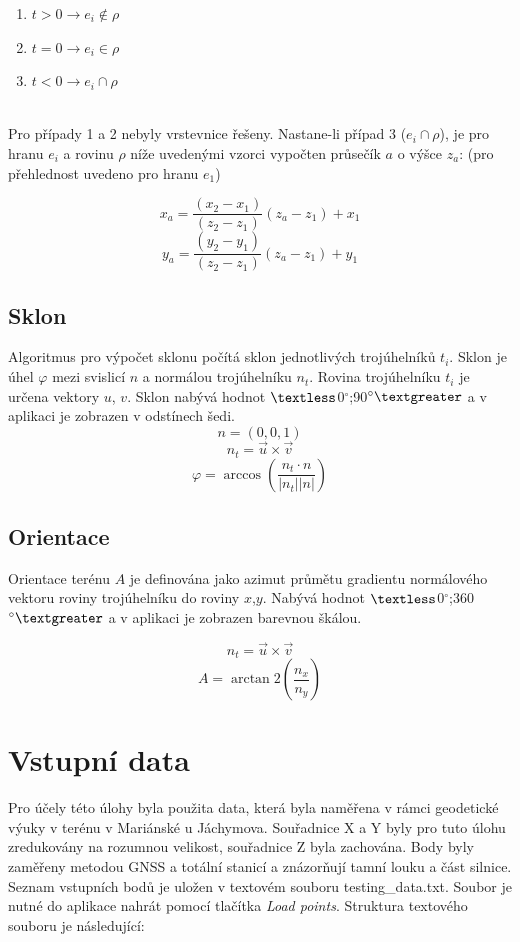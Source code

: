 \documentclass[a4paper, 12pt]{article}
\begin{document}
\begin{enumerate}
\item $t > 0 \rightarrow e_i \notin \rho$ 
\item $t = 0 \rightarrow e_i \in \rho$
\item $t < 0 \rightarrow e_i \cap \rho$
\end{enumerate}
~\\
Pro případy 1 a 2 nebyly vrstevnice řešeny. Nastane-li případ 3 ($e_i \cap \rho$), je pro hranu $e_i$ a rovinu $\rho$ níže uvedenými vzorci vypočten průsečík $a$ o výšce $z_a$: (pro přehlednost uvedeno pro hranu $e_1$)

$$ x_a = \frac{(x_2-x_1)}{(z_2-z_1)}(z_a-z_1)+x_1 $$
$$ y_a = \frac{(y_2-y_1)}{(z_2-z_1)}(z_a-z_1)+y_1 $$

\subsection{Sklon}
Algoritmus pro výpočet sklonu počítá sklon jednotlivých trojúhelníků $t_i$. Sklon je úhel $\varphi$ mezi svislicí $n$ a normálou trojúhelníku $n_t$. Rovina trojúhelníku $t_i$ je určena vektory $u$, $v$. Sklon nabývá hodnot $\textless$0$^\circ$;90$^\circ\textgreater$ a v aplikaci je zobrazen v odstínech šedi.\\

$$n = (0,0,1)$$
$$n_t = \vec{u}\times \vec{v}$$
$$\varphi =\arccos\left(\frac{n_t \cdot n}{|n_t| |n|}\right)$$

\subsection{Orientace}
Orientace terénu $A$ je definována jako azimut průmětu gradientu normálového vektoru roviny trojúhelníku do roviny $x$,$y$. Nabývá hodnot $\textless$0$^\circ$;360$^\circ\textgreater$ a v aplikaci je zobrazen barevnou škálou.

$$n_t = \vec{u}\times \vec{v}$$
$$A = \arctan2\left(\frac{n_x}{n_y}\right)$$


\section{Vstupní data}
Pro účely této úlohy byla použita data, která byla naměřena v rámci geodetické výuky v terénu v Mariánské u Jáchymova. Souřadnice X a Y byly pro tuto úlohu zredukovány na rozumnou velikost, souřadnice Z byla zachována. Body byly zaměřeny metodou GNSS a totální stanicí a znázorňují tamní louku a část silnice. Seznam vstupních bodů je uložen v textovém souboru testing\_data.txt. Soubor je nutné do aplikace nahrát pomocí tlačítka \textsl{Load points}. Struktura textového souboru je následující:\\
\end{document}
